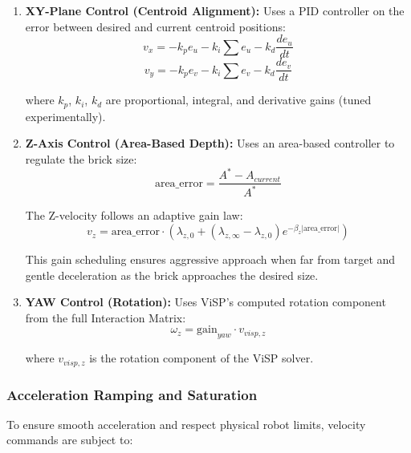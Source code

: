 \begin{enumerate}
    \item \textbf{XY-Plane Control (Centroid Alignment):} Uses a PID controller on the error between desired and current centroid positions:
    \begin{equation}
        v_x = -k_p e_u - k_i \sum e_u - k_d \frac{de_u}{dt}
    \end{equation}
    \begin{equation}
        v_y = -k_p e_v - k_i \sum e_v - k_d \frac{de_v}{dt}
    \end{equation}
    
    where $k_p$, $k_i$, $k_d$ are proportional, integral, and derivative gains (tuned experimentally).
    
    \item \textbf{Z-Axis Control (Area-Based Depth):} Uses an area-based controller to regulate the brick size:
    \begin{equation}
        \text{area\_error} = \frac{A^* - A_{current}}{A^*}
    \end{equation}
    
    The Z-velocity follows an adaptive gain law:
    \begin{equation}
        v_z = \text{area\_error} \cdot \left( \lambda_{z,0} + (\lambda_{z,\infty} - \lambda_{z,0}) e^{-\beta_z |\text{area\_error}|} \right)
    \end{equation}
    
    This gain scheduling ensures aggressive approach when far from target and gentle deceleration as the brick approaches the desired size.
    
    \item \textbf{YAW Control (Rotation):} Uses ViSP's computed rotation component from the full Interaction Matrix:
    \begin{equation}
        \omega_z = \text{gain}_{yaw} \cdot v_{visp,z}
    \end{equation}
    
    where $v_{visp,z}$ is the rotation component of the ViSP solver.
\end{enumerate}

\subsubsection{Acceleration Ramping and Saturation}
To ensure smooth acceleration and respect physical robot limits, velocity commands are subject to:

